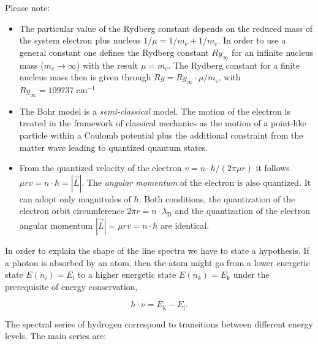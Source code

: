 \documentclass[
  a4paper,
]{book}
\begin{document}
Please note:

\begin{itemize}
\item
  The particular value of the Rydberg constant depends on the reduced
  mass of the system electron plus nucleus
  \(1/\mu = 1/m_{\mathrm{e}} + 1/m_{\mathrm{c}}\). In order to use a
  general constant one defines the Rydberg constant \(Ry_{\infty}\) for
  an infinite nucleus mass (\(m_{\mathrm{c}} \longrightarrow \infty\))
  with the result \(\mu = m_{\mathrm{e}}\). The Rydberg constant for a
  finite nucleus mass then is given through
  \(Ry = Ry_{\infty} \cdot \mu /m_{\mathrm{e}}\), with
  \(Ry_{\infty} =  109737 \; \mathrm{cm}^{-1}\)
\item
  The Bohr model is a \emph{semi-classical} model. The motion of the
  electron is treated in the framework of classical mechanics as the
  motion of a point-like particle within a Coulomb potential plus the
  additional constraint from the matter wave leading to quantized
  quantum states.
\item
  From the quantized velocity of the electron
  \(v = n \cdot h / (2 \pi \mu r)\) it follows
  \(\mu r v = n \cdot \hbar = \left| \vec{L} \right|\). The
  \emph{angular momentum} of the electron is also quantized. It can
  adopt only magnitudes of \(\hbar\). Both conditions, the quantization
  of the electron orbit circumference
  \(2 \pi r = n \cdot \lambda_{\mathrm{D}}\) and the quantization of the
  electron angular momentum
  \(\left| \vec{L} \right| = \mu r v = n \cdot \hbar\) are identical.
\end{itemize}

In order to explain the shape of the line spectra we have to state a
hypothesis. If a photon is absorbed by an atom, then the atom might go
from a lower energetic state \(E \left( n_i \right) = E_{\mathrm{i}}\)
to a higher energetic state \(E \left( n_k \right) = E_{\mathrm{k}}\)
under the prerequisite of energy conservation,

\[
h \cdot \nu = E_{\mathrm{k}} - E_{\mathrm{i}} \mathrm{.}
\]

The spectral series of hydrogen correspond to transitions between
different energy levels. The main series are:
\end{document}
